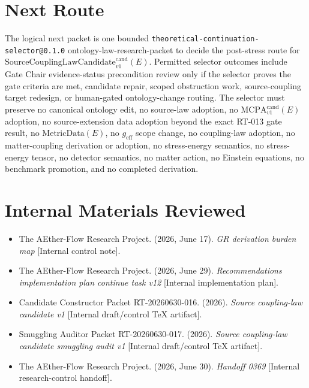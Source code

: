 \documentclass[11pt]{article}
\newcommand{\MetricData}{\mathrm{MetricData}}
\newcommand{\geff}{g_{\mathrm{eff}}}
\newcommand{\MCPA}{\mathrm{MCPA}^{\mathrm{cand}}_{v1}}
\newcommand{\SourceCoupCand}{\mathrm{SourceCouplingLawCandidate}^{\mathrm{cand}}_{v1}}
\begin{document}
\section{Next Route}

The logical next packet is one bounded
\texttt{theoretical-continuation-selector@0.1.0} ontology-law-research-packet
to decide the post-stress route for \(\SourceCoupCand(E)\). Permitted selector
outcomes include Gate Chair evidence-status precondition review only if the
selector proves the gate criteria are met, candidate repair, scoped
obstruction work, source-coupling target redesign, or human-gated
ontology-change routing. The selector must preserve no canonical ontology
edit, no source-law adoption, no \(\MCPA(E)\) adoption, no source-extension
data adoption beyond the exact RT-013 gate result, no \(\MetricData(E)\), no
\(\geff\) scope change, no coupling-law adoption, no matter-coupling
derivation or adoption, no stress-energy semantics, no stress-energy tensor,
no detector semantics, no matter action, no Einstein equations, no benchmark
promotion, and no completed derivation.

\section{Internal Materials Reviewed}

\begin{itemize}
\item The AEther-Flow Research Project. (2026, June 17). \textit{GR derivation burden map} [Internal control note].
\item The AEther-Flow Research Project. (2026, June 29). \textit{Recommendations implementation plan continue task v12} [Internal implementation plan].
\item Candidate Constructor Packet RT-20260630-016. (2026). \textit{Source coupling-law candidate v1} [Internal draft/control TeX artifact].
\item Smuggling Auditor Packet RT-20260630-017. (2026). \textit{Source coupling-law candidate smuggling audit v1} [Internal draft/control TeX artifact].
\item The AEther-Flow Research Project. (2026, June 30). \textit{Handoff 0369} [Internal research-control handoff].
\end{itemize}
\end{document}
